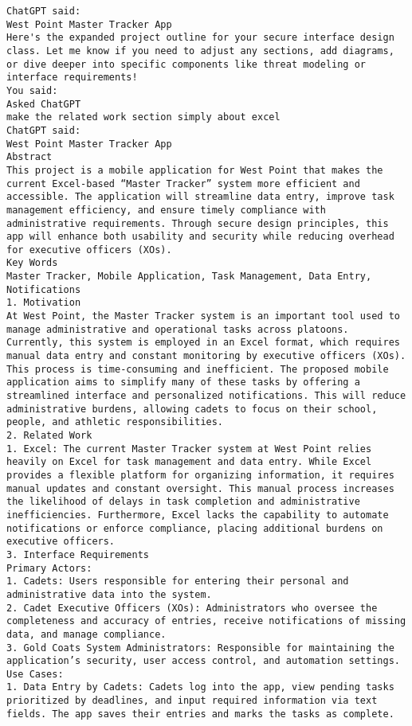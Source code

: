 \documentclass [11pt]{article}
\begin{document}
\begin{lstlisting}
ChatGPT said:
West Point Master Tracker App
Here's the expanded project outline for your secure interface design class. Let me know if you need to adjust any sections, add diagrams, or dive deeper into specific components like threat modeling or interface requirements!
You said:
Asked ChatGPT
make the related work section simply about excel
ChatGPT said:
West Point Master Tracker App
Abstract
This project is a mobile application for West Point that makes the current Excel-based “Master Tracker” system more efficient and accessible. The application will streamline data entry, improve task management efficiency, and ensure timely compliance with administrative requirements. Through secure design principles, this app will enhance both usability and security while reducing overhead for executive officers (XOs).
Key Words
Master Tracker, Mobile Application, Task Management, Data Entry, Notifications
1. Motivation
At West Point, the Master Tracker system is an important tool used to manage administrative and operational tasks across platoons. Currently, this system is employed in an Excel format, which requires manual data entry and constant monitoring by executive officers (XOs). This process is time-consuming and inefficient. The proposed mobile application aims to simplify many of these tasks by offering a streamlined interface and personalized notifications. This will reduce administrative burdens, allowing cadets to focus on their school, people, and athletic responsibilities.
2. Related Work
1. Excel: The current Master Tracker system at West Point relies heavily on Excel for task management and data entry. While Excel provides a flexible platform for organizing information, it requires manual updates and constant oversight. This manual process increases the likelihood of delays in task completion and administrative inefficiencies. Furthermore, Excel lacks the capability to automate notifications or enforce compliance, placing additional burdens on executive officers.
3. Interface Requirements
Primary Actors:
1. Cadets: Users responsible for entering their personal and administrative data into the system.
2. Cadet Executive Officers (XOs): Administrators who oversee the completeness and accuracy of entries, receive notifications of missing data, and manage compliance.
3. Gold Coats System Administrators: Responsible for maintaining the application’s security, user access control, and automation settings.
Use Cases:
1. Data Entry by Cadets: Cadets log into the app, view pending tasks prioritized by deadlines, and input required information via text fields. The app saves their entries and marks the tasks as complete.

\end{lstlisting}
\end{document}
